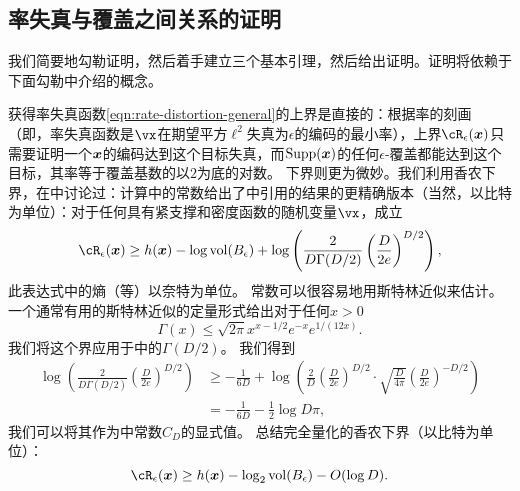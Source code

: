 \documentclass[../../book-main_zh.tex]{subfiles}
\begin{document}
\subsection{率失真与覆盖之间关系的证明}

我们简要地勾勒证明，然后着手建立三个基本引理，然后给出证明。证明将依赖于下面勾勒中介绍的概念。

获得率失真函数\eqref{eqn:rate-distortion-general}的上界是直接的：根据率的刻画（即，率失真函数是$\vx$在期望平方$\ell^2$失真为$\epsilon$的编码的最小率），上界$\cR_{\epsilon}(\x)$只需要证明一个$\bm{x}$的编码达到这个目标失真，而$\operatorname{Supp}(\bm{x})$的任何$\epsilon$-覆盖都能达到这个目标，其率等于覆盖基数的以$2$为底的对数。
下界则更为微妙。我们利用香农下界，在中讨论过：计算\cite[\S III, (22)]{Linder1994-ej}中的常数给出了中引用的结果的更精确版本（当然，以比特为单位）：对于任何具有紧支撑和密度函数的随机变量$\vx$，成立
\begin{equation}\label{eq:slb-appendix-1}
    \cR_{\epsilon}(\x)
    \geq
    h(\x)
    - \log \volume(B_{\epsilon})
    +
    \log
    \left(
    \frac{
    	2
    }
    {
    	D \Gamma(D/2)
    }
    \left(
    \frac{
    	D
    }
    {
    	2e
    }
    \right)^{D/2}
    \right),
\end{equation}
此表达式中的熵（等）以奈特为单位。
常数可以很容易地用斯特林近似来估计。
一个通常有用的斯特林近似的定量形式给出对于任何$x > 0$ \cite{Jameson2015-hy}
\begin{equation}
    \Gamma(x) \leq \sqrt{2\pi} x^{x - 1/2} e^{-x} e^{1/(12x)}.
\end{equation}
我们将这个界应用于中的$\Gamma(D/2)$。
我们得到
\begin{align}
    \log
    \left(
    \frac{
        2
    }
    {
        D \Gamma(D/2)
    }
    \left(
    \frac{
        D
    }
    {
        2e
    }
    \right)^{D/2}
    \right)
    &\geq
    -\frac{1}{6D}
    +
    \log\left(
        \frac{2}{D} 
        \left(
        \frac{
            D
        }
        {
            2e
        }
        \right)^{D/2}
        \cdot
        \sqrt{\frac{D}{4\pi}}
        \left(
        \frac{D}{2e}
        \right)^{-D/2}
    \right)
    \\
    &=
    -\frac{1}{6D}
    - \frac{1}{2}\log D\pi,\label{eq:slb-constant-est}
\end{align}
我们可以将其作为中常数$C_D$的显式值。
总结完全量化的香农下界（以比特为单位）：
\begin{equation}\label{eq:slb-appendix}
    \cR_{\epsilon}(\x)
    \geq
    h(\x)
    - \log_2 \volume(B_{\epsilon})
    - O(\log D).
\end{equation}
\end{document}
